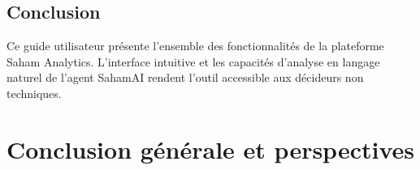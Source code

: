 \documentclass[a4paper,12pt]{report}
\begin{document}
\section{Conclusion}
\begin{doublespace}
Ce guide utilisateur présente l'ensemble des fonctionnalités de la plateforme Saham Analytics. L'interface intuitive et les capacités d'analyse en langage naturel de l'agent SahamAI rendent l'outil accessible aux décideurs non techniques.
\end{doublespace}

\newpage
\chapter*{Conclusion générale et perspectives}
\end{document}
